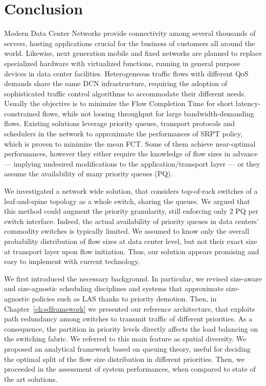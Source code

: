 \chapter*{Conclusion}
Modern Data Center Networks provide connectivity among several thousands of servers, hosting applications crucial for the business of customers all around the world. Likewise, next generation mobile and fixed networks are planned to replace specialized hardware with virtualized functions, running in general purpose devices in data center facilities. Heterogeneous traffic flows with different QoS demands share the same DCN infrastructure, requiring the adoption of sophisticated traffic control algorithms to accommodate their different needs. Usually the objective is to minimize the Flow Completion Time for short latency-constrained flows, while not loosing throughput for large bandwidth-demanding flows. Existing solutions leverage priority queues, transport protocols and schedulers in the network to approximate the performances of SRPT policy, which is proven to minimize the mean FCT. Some of them achieve near-optimal performances, however they either require the knowledge of flow sizes in advance --- implying undesired modifications to the application/transport layer --- or they assume the availability of many priority queues (PQ).

We investigated a network wide solution, that considers top-of-rack switches of a leaf-and-spine topology as a whole switch, sharing the queues. We argued that this method could augment the priority granularity, still enforcing only 2 PQ per switch interface. Indeed, the actual availability of priority queues in data centers' commodity switches is typically limited. We assumed to know only the overall probability distribution of flow sizes at data center level, but not their exact size at transport layer upon flow initiation. Thus, our solution appears promising and easy to implement with current technology.

We first introduced the necessary background. In particular, we revised size-aware and size-agnostic scheduling disciplines and systems that approximate size-agnostic policies such as LAS thanks to priority demotion. Then, in Chapter~\ref{ch:sdframework} we presented our reference architecture, that exploits path redundancy among switches to transmit traffic of different priorities. As a consequence, the partition in priority levels directly affects the load balancing on the switching fabric. We referred to this main feature as spatial diversity. We proposed an analytical framework based on queuing theory, useful for deciding the optimal split of the flow size distribution in different priorities. Then, we proceeded in the assessment of system performances, when compared to state of the art solutions.


